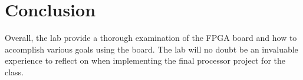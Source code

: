 \documentclass[letterpaper]{article} %
\begin{document}
\section{Conclusion}
        Overall, the lab provide a thorough examination of the FPGA board and how to accomplish various goals using the board. The lab will no doubt be an invaluable experience to reflect on when implementing the final processor project for the class.  
\end{document}
